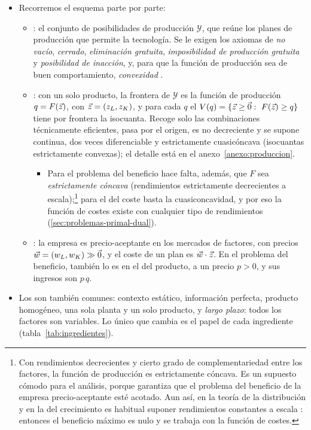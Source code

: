 \documentclass[11pt]{article}
\begin{document}
\begin{itemize}
\item Recorremos el esquema parte por parte:
  \begin{itemize}
  \item {}: el conjunto de posibilidades de producción $\mathcal{Y}$, que reúne los planes de producción que permite la tecnología. Se le exigen los axiomas de \emph{no vacío}, \emph{cerrado}, \emph{eliminación gratuita}, \emph{imposibilidad de producción gratuita} y \emph{posibilidad de inacción}, y, para que la función de producción sea de buen comportamiento, \emph{convexidad} .
  \item {}: con un solo producto, la frontera de $\mathcal{Y}$ es la función de producción $q=F(\vec{z})$, con $\vec{z}=(z_L,z_K)$, y para cada $q$ el  $V(q)=\{\vect{z}\geq\vect{0}:\ F(\vect{z})\geq q\}$ tiene por frontera la isocuanta\nocite{Varian1992Microeconomic}. Recoge solo las combinaciones técnicamente eficientes, pasa por el origen, es no decreciente y se supone continua, dos veces diferenciable y estrictamente cuasicóncava (isocuantas estrictamente convexas); el detalle está en el anexo~\ref{anexo:produccion}.
    \begin{itemize}
    \item Para el problema del beneficio hace falta, además, que $F$ sea \emph{estrictamente cóncava} (rendimientos estrictamente decrecientes a escala);\footnote{Con rendimientos decrecientes y cierto grado de complementariedad entre los factores, la función de producción es estrictamente cóncava. Es un supuesto cómodo para el análisis, porque garantiza que el problema del beneficio de la empresa precio-aceptante esté acotado. Aun así, en la teoría de la distribución y en la del crecimiento es habitual suponer rendimientos constantes a escala : entonces el beneficio máximo es nulo y se trabaja con la función de costes.} para el del coste basta la cuasiconcavidad, y por eso la función de costes existe con cualquier tipo de rendimientos (\ref{sec:problemas-primal-dual}).
    \end{itemize}
  \item {}: la empresa es precio-aceptante en los mercados de factores, con precios $\vec{w}=(w_L,w_K)\gg\vec{0}$, y el coste de un plan es $\vec{w}\cdot\vec{z}$. En el problema del beneficio, también lo es en el del producto, a un precio $p>0$, y sus ingresos son $p\,q$.
  \end{itemize}
\item Los  son también comunes: contexto estático, información perfecta, producto homogéneo, una sola planta y un solo producto, y \emph{largo plazo}: todos los factores son variables. Lo único que cambia es el papel de cada ingrediente (tabla~\ref{tab:ingredientes}).
\end{itemize}
\end{document}
